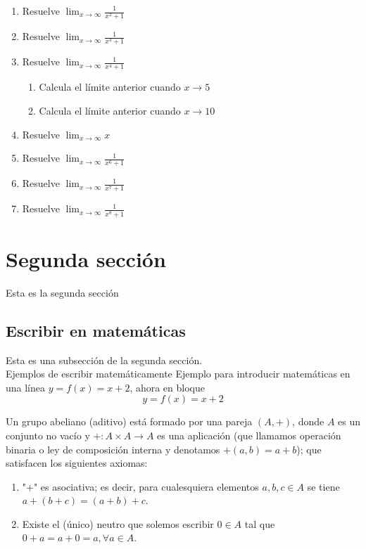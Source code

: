 \documentclass[10pt,a4paper]{article}
\begin{document}
\begin{enumerate}
	\item Resuelve $\lim_{x\to \infty}\frac{1}{x^2+1}$
	\item Resuelve $\lim_{x\to \infty}\frac{1}{x^3+1}$
	\item Resuelve $\lim_{x\to \infty}\frac{1}{x^4+1}$
	\addtocounter{enumi}{2}
	\begin{enumerate} 
		\item Calcula el límite anterior cuando $x\to 5$
		\item Calcula el límite anterior cuando $x\to 10$
	\end{enumerate} 
	\item Resuelve $\lim_{x\to \infty} x$
	\item Resuelve $\lim_{x\to \infty}\frac{1}{x^6+1}$
	\item Resuelve $\lim_{x\to \infty}\frac{1}{x^7+1}$
	\addtocounter{enumi}{-5}
	\item Resuelve $\lim_{x\to \infty}\frac{1}{x^8+1}$
\end{enumerate}


\section{Segunda sección}
Esta es la segunda sección
\subsection[Matemáticas]{Escribir en matemáticas}
Esta es una subsección de la segunda sección.\\
Ejemplos de escribir matemáticamente
Ejemplo para introducir matemáticas en una línea $y=f(x)=x+2$, ahora en bloque \[y=f(x)=x+2\]

\begin{definicion} \label{definicion:abeliano}
	Un grupo abeliano (aditivo) está formado por una pareja $(A, +)$, donde $A$ es un conjunto no vacío y $+ : A\times A \rightarrow A$ es una aplicación (que llamamos operación binaria o ley de composición interna y denotamos $+ (a, b) = a + b$); que satisfacen los siguientes axiomas:
	\begin{enumerate}
		\item "+" es asociativa; es decir, para cualesquiera elementos $ a,b,c\in A$ se tiene $a+(b+c)=(a+b)+c$.
		\item Existe el (único) neutro que solemos escribir $0\in A$ tal que $0+a=a+0=a, \forall a\in A$.
	\end{enumerate}
\end{definicion}
\end{document}
